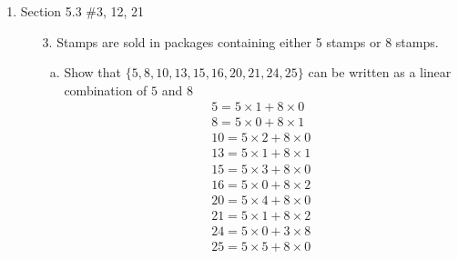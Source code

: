 \documentclass[12pt]{article}
\begin{document}
\begin{enumerate}
    
    \newpage
    \item Section 5.3 \#3, 12, 21
        \begin{enumerate}
            \item[3.] Stamps are sold in packages containing either 5 stamps or 8 stamps.
                \begin{enumerate}[a.] 
                    \item Show that $\{5, 8,10,13,15,16,20,21,24,25\}$ can be written as a linear combination of $5$ and $8$
                        \begin{align*}
                            5 = 5\times 1 + 8 \times 0\\
                            8 = 5 \times 0 + 8 \times 1\\
                            10 = 5 \times 2 + 8 \times 0\\
                            13 = 5 \times 1 + 8 \times 1\\
                            15 = 5 \times 3 + 8 \times 0\\
                            16 = 5 \times 0 + 8 \times 2\\
                            20 = 5 \times 4 + 8 \times 0\\
                            21 = 5 \times 1 + 8 \times 2\\
                            24 = 5 \times 0 + 3 \times 8\\
                            25 = 5 \times 5 + 8 \times 0
                        \end{align*}


\end{enumerate}
\end{enumerate}
\end{enumerate}
\end{document}

